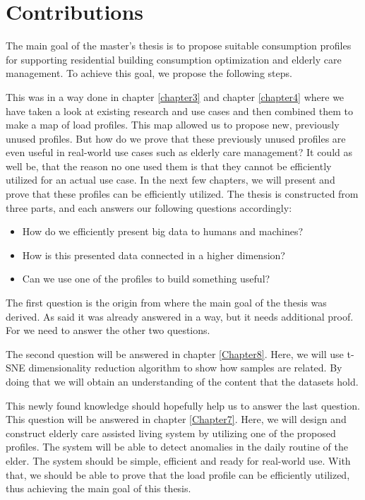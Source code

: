 
\chapter{Contributions} %
\label{Chapter5} %


The main goal of the master's thesis is to propose suitable consumption profiles for supporting residential building consumption optimization and elderly care management.
To achieve this goal, we propose the following steps.

This was in a way done in chapter \ref{chapter3} and chapter \ref{chapter4} where we have taken a look at existing research and use cases and then combined them to make a map of load profiles.
This map allowed us to propose new, previously unused profiles. 
But how do we prove that these previously unused profiles are even useful in real-world use cases such as elderly care management? 
It could as well be, that the reason no one used them is that they cannot be efficiently utilized for an actual use case. 
In the next few chapters, we will present and prove that these profiles can be efficiently utilized.
The thesis is constructed from three parts, and each answers our following questions accordingly:

\begin{itemize}
	\item How do we efficiently present big data to humans and machines?
	\item How is this presented data connected in a higher dimension?
	\item Can we use one of the profiles to build something useful? 
\end{itemize}

The first question is the origin from where the main goal of the thesis was derived. 
As said it was already answered in a way, but it needs additional proof.
For we need to answer the other two questions. 

The second question will be answered in chapter \ref{Chapter8}.
Here, we will use t-SNE dimensionality reduction algorithm to show how samples are related.
By doing that we will obtain an understanding of the content that the datasets hold.

This newly found knowledge should hopefully help us to answer the last question.
This question will be answered in chapter \ref{Chapter7}.
Here, we will design and construct elderly care assisted living system by utilizing one of the proposed profiles.
The system will be able to detect anomalies in the daily routine of the elder.
The system should be simple, efficient and ready for real-world use.
With that, we should be able to prove that the load profile can be efficiently utilized,
thus achieving the main goal of this thesis.



